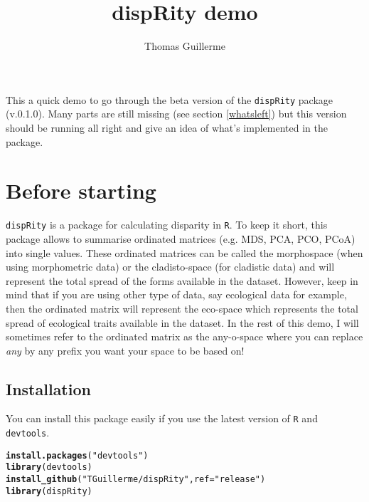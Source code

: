 \documentclass{article}\usepackage[]{graphicx}\usepackage[]{color}
\makeatletter
\newcommand{\hlstr}[1]{\textcolor[rgb]{0.192,0.494,0.8}{#1}}%
\newcommand{\hlstd}[1]{\textcolor[rgb]{0.345,0.345,0.345}{#1}}%
\newcommand{\hlkwc}[1]{\textcolor[rgb]{0.333,0.667,0.333}{#1}}%
\newcommand{\hlkwd}[1]{\textcolor[rgb]{0.737,0.353,0.396}{\textbf{#1}}}%
\newenvironment{kframe}{%
 \def\at@end@of@kframe{}%
 \ifinner\ifhmode%
  \def\at@end@of@kframe{\end{minipage}}%
  \begin{minipage}{\columnwidth}%
 \fi\fi%
 \def\FrameCommand##1{\hskip\@totalleftmargin \hskip-\fboxsep
 \colorbox{shadecolor}{##1}\hskip-\fboxsep
     \hskip-\linewidth \hskip-\@totalleftmargin \hskip\columnwidth}%
 \MakeFramed {\advance\hsize-\width
   \@totalleftmargin\z@ \linewidth\hsize
   \@setminipage}}%
 {\par\unskip\endMakeFramed%
 \at@end@of@kframe}
\newenvironment{knitrout}{}{} %
\newcommand{\dispRity}{\texttt{dispRity} }
\newcommand{\R}{\texttt{R} }
\makeatother
\begin{document}
\title{dispRity demo}


\author{Thomas Guillerme}

\maketitle

This a quick demo to go through the beta version of the \dispRity package (v.0.1.0).
Many parts are still missing (see section \ref{whatsleft}) but this version should be running all right and give an idea of what's implemented in the package.

\section{Before starting}

\dispRity is a package for calculating disparity in \texttt{R}.
To keep it short, this package allows to summarise ordinated matrices (e.g. MDS, PCA, PCO, PCoA) into single values.
These ordinated matrices can be called the morphospace (when using morphometric data) or the cladisto-space (for cladistic data) and will represent the total spread of the forms available in the dataset.
However, keep in mind that if you are using other type of data, say ecological data for example, then the ordinated matrix will represent the eco-space which represents the total spread of ecological traits available in the dataset.
In the rest of this demo, I will sometimes refer to the ordinated matrix as the any-o-space where you can replace \textit{any} by any prefix you want your space to be based on!

\subsection{Installation}
You can install this package easily if you use the latest version of \R and \texttt{devtools}.

\begin{knitrout}
\color{fgcolor}\begin{kframe}
\begin{alltt}
\hlkwd{install.packages}\hlstd{(}\hlstr{"devtools"}\hlstd{)}
\hlkwd{library}\hlstd{(devtools)}
\hlkwd{install_github}\hlstd{(}\hlstr{"TGuillerme/dispRity"}\hlstd{,} \hlkwc{ref} \hlstd{=} \hlstr{"release"}\hlstd{)}
\hlkwd{library}\hlstd{(dispRity)}
\end{alltt}
\end{kframe}
\end{knitrout}
\end{document}
